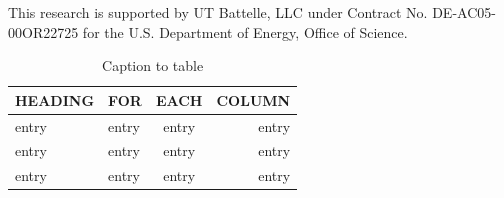 \documentclass[final]{iucr}              %
\begin{document}

This research is supported by UT Battelle, LLC under Contract No.
DE-AC05-00OR22725 for the U.S. Department of Energy, Office of Science.



     
   




\begin{table}
\caption{Caption to table}
\begin{tabular}{llcr}      %
 HEADING    & FOR        & EACH       & COLUMN     \\
\hline
 entry      & entry      & entry      & entry      \\
 entry      & entry      & entry      & entry      \\
 entry      & entry      & entry      & entry      \\
\end{tabular}
\end{table}




\end{document}
